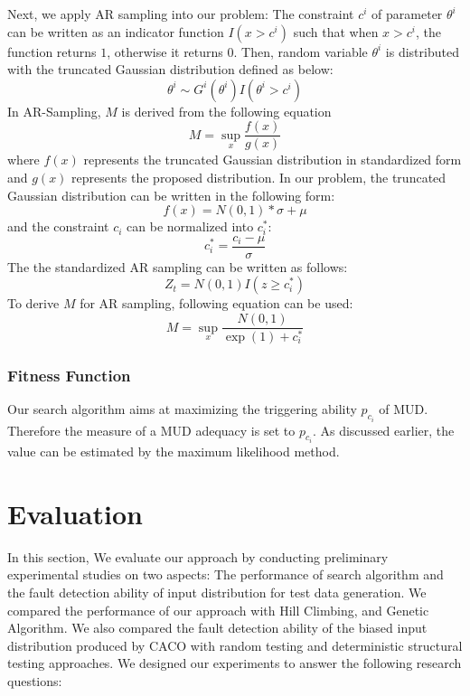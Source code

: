 \documentclass[journal]{IEEEtran}
\begin{document}
Next, we apply AR sampling into our problem:
The constraint \(c^{i}\) of parameter \(\theta^{i}\) can be written as an indicator function \(I(x > c^{i})\) \cite{indicator} such that when \(x > c^{i}\), the function returns \(1\), otherwise it returns \(0\). Then, random variable \(\theta^{i}\) is distributed with the truncated Gaussian distribution defined as below: 
\[\theta^{i} \sim G^{i}(\theta^{i})I(\theta^{i} > c^{i})\]
In AR-Sampling, \(M\) is derived from the following equation
\[M = \sup_{x}\frac{f(x)}{g(x)}\]
where \(f(x)\) represents the truncated Gaussian distribution in standardized form and \(g(x)\) represents the proposed distribution.
In our problem, the truncated Gaussian distribution can be written in the following form:
\[f(x) = N(0,1)*\sigma + \mu\]
and the constraint \(c_{i}\) can be normalized into \(c_{i}^*\):
\[c_{i}^* = \frac{c_{i} - \mu}{\sigma}\]
The the standardized AR sampling can be written as follows:
\[Z_{t} = N(0,1)I(z\geq c_{i}^*)\] 
To derive \(M\) for AR sampling, following equation can be used:
 \[M = \sup_{x}\frac{N(0,1)}{\exp(1) + c_{i}^*}\]

\subsubsection{Fitness Function}
Our search algorithm aims at maximizing the triggering ability \(p_{c_{i}}\) of MUD. Therefore the measure of a MUD adequacy is set to \(p_{c_{i}}\).  As discussed earlier, the value can be estimated by the maximum likelihood method.

\section{Evaluation}
In this section, We evaluate our approach by conducting preliminary experimental studies on two aspects: The performance of search algorithm and the fault detection ability of input distribution for test data generation. We compared the performance of our approach with Hill Climbing, and Genetic Algorithm. We also compared the fault detection ability of the biased input distribution produced by CACO with random testing and deterministic structural testing approaches. We designed our experiments to answer the following research questions:
\end{document}
